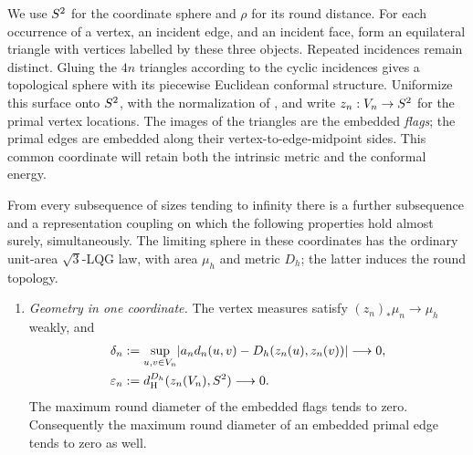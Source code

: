 We use \(S^2\) for the coordinate sphere and \(\rho\) for its round
distance.  For each occurrence of a vertex, an incident edge, and an
incident face, form an equilateral triangle with vertices labelled by
these three objects.  Repeated incidences remain distinct.  Gluing the
\(4n\) triangles according to the cyclic incidences gives a topological
sphere with its piecewise Euclidean conformal structure.  Uniformize this
surface onto \(S^2\), with the normalization of \cite{SC}, and write
\(z_n:V_n\to S^2\) for the primal vertex locations.  The images of the
triangles are the embedded \emph{flags}; the primal edges are embedded
along their vertex-to-edge-midpoint sides.  This common coordinate will
retain both the intrinsic metric and the conformal energy.

\begin{proposition}
\label{prop:inputs}
From every subsequence of sizes tending to infinity there is a further
subsequence and a representation coupling on which the following
properties hold almost surely, simultaneously.  The limiting sphere in
these coordinates has the ordinary unit-area \(\sqrt3\)-LQG law, with
area \(\mu_h\) and metric \(D_h\); the latter induces the round topology.

\begin{enumerate}[label=\textup{(\roman*)}]
\item \emph{Geometry in one coordinate.}  The vertex measures satisfy
\((z_n)_*\mu_n\to\mu_h\) weakly, and
\begin{align}
 \delta_n&:=\sup_{u,v\in V_n}
  \lvert a_nd_n(u,v)-D_h(z_n(u),z_n(v))\rvert\longrightarrow0,
       \label{eq:vertex-distortion}\\
 \varepsilon_n&:=d_{\mathrm H}^{D_h}(z_n(V_n),S^2)
       \longrightarrow0.\label{eq:vertex-density}
\end{align}
The maximum round diameter of the embedded flags tends to zero.
Consequently the maximum round diameter of an embedded primal edge tends
to zero as well.


\end{enumerate}
\end{proposition}
